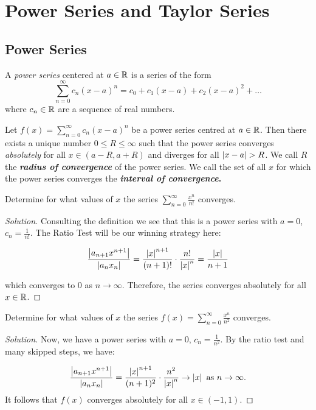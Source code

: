 \documentclass{article}
\begin{document}
    \section{Power Series and Taylor Series}
    \subsection{Power Series}
    \begin{defi}
      A \emph{power series} centered at \(a \in \mathbb{R}\) is a series of the form
      \[
        \sum_{n=0}^{\infty}c_n(x-a)^n = c_0 + c_1(x-a) + c_2(x-a)^2 + \ldots
      \]
      where \(c_n \in \mathbb{R}\) are a sequence of real numbers.
    \end{defi}

    \begin{prop}
      \everymath{\displaystyle}
      Let \(f(x) = \sum_{n=0}^{\infty}c_n(x-a)^n\) be a power series centred at \(a \in \mathbb{R}\). Then there exists a unique number \(0 \leq R \leq \infty\) such that the power series converges \emph{absolutely} for all \(x \in (a-R, a+R)\) and diverges for all \(\left\lvert x-a\right\rvert > R\). We call \(R\) the \textbf{\emph{radius of convergence}} of the power series. We call the set of all \(x\) for which the power series converges the \textbf{\emph{interval of convergence}.}
    \end{prop}
{
  \everymath{\displaystyle}
    \begin{eg}
      Determine for what values of \(x\) the series \(\sum_{n=0}^{\infty}\frac{x^n}{n!}\) converges.

      \begin{proof}[Solution]
        Consulting the definition we see that this is a power series with \(a = 0\), \(c_n = \frac{1}{n!}\). The Ratio Test will be our winning strategy here:
  
        \begin{align*}
          \frac{\left\lvert a_{n+1}x^{n+1}\right\rvert}{\left\lvert a_nx_n\right\rvert} = \frac{\left\lvert x\right\rvert^{n+1}}{(n+1)!} \cdot \frac{n!}{\left\lvert x\right\rvert^n} = \frac{\left\lvert x\right\rvert}{n+1}
        \end{align*}
  
        which converges to 0 as \(n \to \infty\). Therefore, the series converges absolutely for all \(x \in \mathbb{R}\).
      \end{proof}
    \end{eg}


    \begin{eg}
      Determine for what values of \(x\) the series \(f(x) =\sum_{n=0}^{\infty}\frac{x^n}{n^2}\) converges.

      \begin{proof}[Solution]
        Now, we have a power series with \(a = 0\), \(c_n = \frac{1}{n^2}\). By the ratio test and many skipped steps, we have:

        \[
          \frac{\left\lvert a_{n+1}x^{n+1}\right\rvert}{\left\lvert a_nx_n\right\rvert} = \frac{\left\lvert x\right\rvert^{n+1}}{(n+1)^2} \cdot \frac{n^2}{\left\lvert x\right\rvert^n} \to \left\lvert x\right\rvert \text{ as } n \to \infty.
        \]
        It follows that \(f(x)\) converges absolutely for all \(x \in (-1, 1)\).
      \end{proof}
    \end{eg}
}
\end{document}
